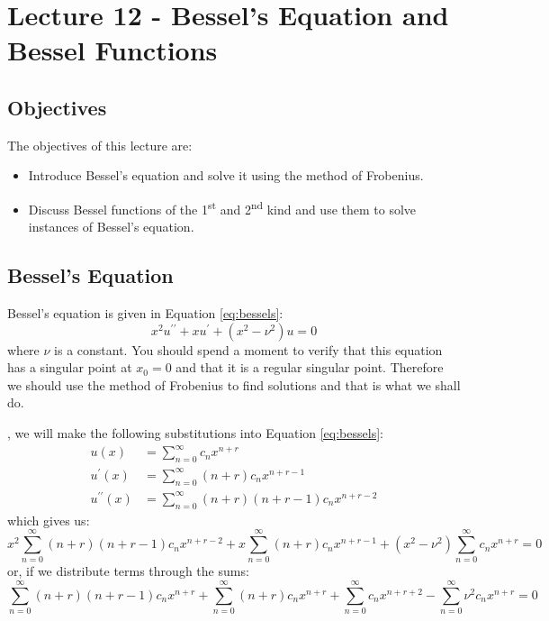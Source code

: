 \chapter{Lecture 12 - Bessel's Equation and Bessel Functions}
\label{ch:lec12}
\section{Objectives}
The objectives of this lecture are:
\begin{itemize}
\item Introduce Bessel's equation and solve it using the method of Frobenius.
\item Discuss Bessel functions of the 1\textsuperscript{st} and 2\textsuperscript{nd} kind and use them to solve instances of Bessel's equation.
\end{itemize}

\section{Bessel's Equation}

Bessel's equation is given in Equation \ref{eq:bessels}:
\begin{equation}
x^{2}u^{\prime \prime} + x u^{\prime} + \left(x^2 - \nu^2\right)u = 0
\label{eq:bessels}
\end{equation}
where $\nu$ is a constant.  You should spend a moment to verify that this equation has a singular point at $x_0 = 0$ and that it is a regular singular point.  Therefore we should use the method of Frobenius to find solutions and that is what we shall do.

, we will make the following substitutions into Equation \ref{eq:bessels}:
\begin{align*}
u(x) &= \sum\limits_{n=0}^{\infty}c_n x^{n+r} \\
u^{\prime}(x) &= \sum\limits_{n=0}^{\infty} (n+r)c_nx^{n+r-1} \\
u^{\prime \prime}(x) &= \sum\limits_{n=0}^{\infty}(n+r)(n+r-1)c_nx^{n+r-2}
\end{align*}
which gives us:
\begin{equation*}
x^2\sum\limits_{n=0}^{\infty}(n+r)(n+r-1)c_nx^{n+r-2} + x\sum\limits_{n=0}^{\infty}(n+r)c_nx^{n+r-1} + \left(x^2-\nu^2 \right)\sum\limits_{n=0}^{\infty}c_nx^{n+r} = 0 
\end{equation*}
\noindent or, if we distribute terms through the sums:
\begin{equation*}
\sum\limits_{n=0}^{\infty}(n+r)(n+r-1)c_nx^{n+r} + \sum\limits_{n=0}^{\infty}(n+r)c_nx^{n+r} + \sum\limits_{n=0}^{\infty}c_nx^{n+r+2} - \sum\limits_{n=0}^{\infty}\nu^2c_nx^{n+r} = 0 
\end{equation*}

